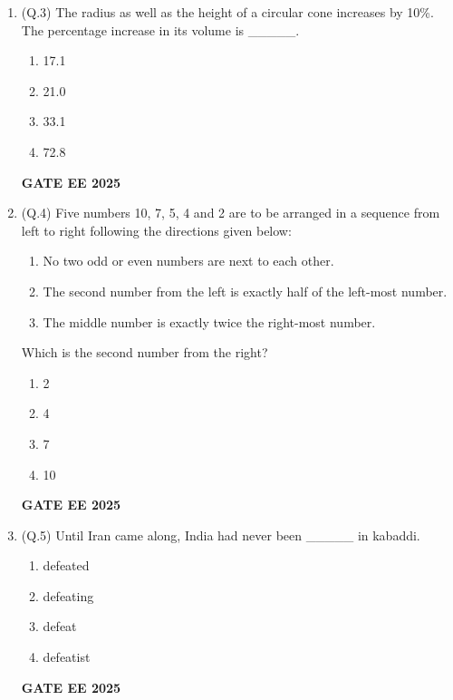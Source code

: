 \documentclass{article}
\begin{document}
\begin{enumerate}[leftmargin=*,label=\textbf{Q.\arabic*},start=1]
    \item (Q.3) The radius as well as the height of a circular cone increases by 10\%. The percentage increase in its volume is \_\_\_\_\_.
    \begin{multicols}{4}
    \begin{enumerate}[label=(\Alph*)]
        \item 17.1
        \item 21.0
        \item 33.1
        \item 72.8
    \end{enumerate}
    \end{multicols}
    \textbf{GATE EE 2025}

    \item (Q.4) Five numbers 10, 7, 5, 4 and 2 are to be arranged in a sequence from left to right following the directions given below:
    \begin{enumerate}[label=\arabic*.]
        \item No two odd or even numbers are next to each other.
        \item The second number from the left is exactly half of the left-most number.
        \item The middle number is exactly twice the right-most number.
    \end{enumerate}
    Which is the second number from the right?
    \begin{multicols}{4}
    \begin{enumerate}[label=(\Alph*)]
        \item 2
        \item 4
        \item 7
        \item 10
    \end{enumerate}
    \end{multicols}
    \textbf{GATE EE 2025}

    \item (Q.5) Until Iran came along, India had never been \_\_\_\_\_ in kabaddi.
    \begin{multicols}{4}
    \begin{enumerate}[label=(\Alph*)]
        \item defeated
        \item defeating
        \item defeat
        \item defeatist
    \end{enumerate}
    \end{multicols}
    \textbf{GATE EE 2025}
\end{enumerate}
\end{document}
